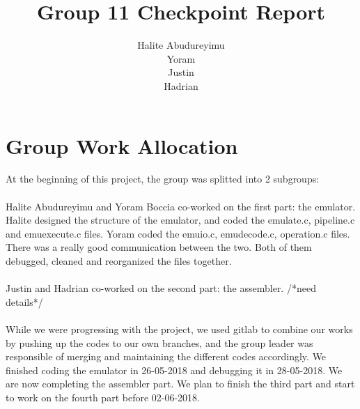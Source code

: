 \documentclass[a4paper]{article}
\title{Group 11 Checkpoint Report}
\author{Halite Abudureyimu\\Yoram\\Justin\\Hadrian}
\begin{document}
\maketitle

\section{Group Work Allocation}
At the beginning of this project, the group was splitted into 2 subgroups:\\ \\
Halite Abudureyimu and Yoram Boccia co-worked on the first part: the emulator. Halite designed the structure of the emulator, and coded the emulate.c, pipeline.c and emuexecute.c files. Yoram coded the emuio.c, emudecode.c, operation.c files. There was a really good communication between the two. Both of them debugged, cleaned and reorganized the files together.
\\\\
Justin and Hadrian co-worked on the second part: the assembler. /*need details*/
\\\\

While we were progressing with the project, we used gitlab to combine our works by pushing up the codes to our own branches, and the group leader was responsible of merging and maintaining the different codes accordingly.
We finished coding the emulator in 26-05-2018 and debugging it in 28-05-2018. We are now completing the assembler part. We plan to finish the third part and start to work on the fourth part before 02-06-2018.
\end{document}
